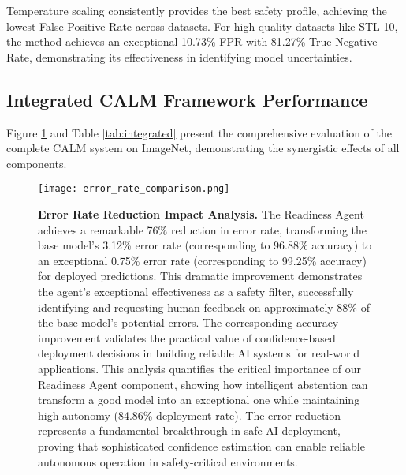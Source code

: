 \documentclass[conference]{IEEEtran}
\begin{document}
Temperature scaling consistently provides the best safety profile, achieving the lowest False Positive Rate across datasets. For high-quality datasets like STL-10, the method achieves an exceptional 10.73\% FPR with 81.27\% True Negative Rate, demonstrating its effectiveness in identifying model uncertainties.

\subsection{Integrated CALM Framework Performance}

Figure \ref{fig:error_reduction} and Table \ref{tab:integrated} present the comprehensive evaluation of the complete CALM system on ImageNet, demonstrating the synergistic effects of all components.

\begin{figure}[!t]
\centering
\texttt{[image: error\_rate\_comparison.png]}
\caption{\textbf{Error Rate Reduction Impact Analysis.} The Readiness Agent achieves a remarkable 76\% reduction in error rate, transforming the base model's 3.12\% error rate (corresponding to 96.88\% accuracy) to an exceptional 0.75\% error rate (corresponding to 99.25\% accuracy) for deployed predictions. This dramatic improvement demonstrates the agent's exceptional effectiveness as a safety filter, successfully identifying and requesting human feedback on approximately 88\% of the base model's potential errors. The corresponding accuracy improvement validates the practical value of confidence-based deployment decisions in building reliable AI systems for real-world applications. This analysis quantifies the critical importance of our Readiness Agent component, showing how intelligent abstention can transform a good model into an exceptional one while maintaining high autonomy (84.86\% deployment rate). The error reduction represents a fundamental breakthrough in safe AI deployment, proving that sophisticated confidence estimation can enable reliable autonomous operation in safety-critical environments.}
\label{fig:error_reduction}
\end{figure}
\end{document}

